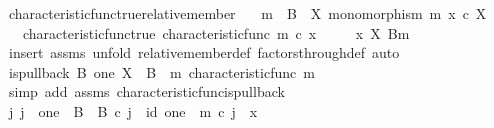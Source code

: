 \begin{isabellebody}
\isamarkupfalse%
%
\endisatagproof
{\isafoldproof}%
%
\isadelimproof
\isanewline
%
\endisadelimproof
\isanewline
{}\isamarkupfalse%
\ characteristic{\isacharunderscore}{\kern0pt}func{\isacharunderscore}{\kern0pt}true{\isacharunderscore}{\kern0pt}relative{\isacharunderscore}{\kern0pt}member{\isacharcolon}{\kern0pt}\isanewline
\ \ \ {\isachardoublequoteopen}m\ {\isacharcolon}{\kern0pt}\ B\ {\isasymrightarrow}\ X{\isachardoublequoteclose}\ {\isachardoublequoteopen}monomorphism\ m{\isachardoublequoteclose}\ {\isachardoublequoteopen}x\ {\isasymin}\isactrlsub c\ X{\isachardoublequoteclose}\isanewline
\ \ \ characteristic{\isacharunderscore}{\kern0pt}func{\isacharunderscore}{\kern0pt}true{\isacharcolon}{\kern0pt}\ {\isachardoublequoteopen}characteristic{\isacharunderscore}{\kern0pt}func\ m\ {\isasymcirc}\isactrlsub c\ x\ {\isacharequal}{\kern0pt}\ {\isasymt}{\isachardoublequoteclose}\isanewline
\ \ \ {\isachardoublequoteopen}x\ {\isasymin}\isactrlbsub X\isactrlesub \ {\isacharparenleft}{\kern0pt}B{\isacharcomma}{\kern0pt}m{\isacharparenright}{\kern0pt}{\isachardoublequoteclose}\isanewline
%
\isadelimproof
%
\endisadelimproof
%
\isatagproof
{}\isamarkupfalse%
\ {\isacharparenleft}{\kern0pt}insert\ assms{\isacharcomma}{\kern0pt}\ unfold\ relative{\isacharunderscore}{\kern0pt}member{\isacharunderscore}{\kern0pt}def{}\ factors{\isacharunderscore}{\kern0pt}through{\isacharunderscore}{\kern0pt}def{\isacharcomma}{\kern0pt}\ auto{\isacharparenright}{\kern0pt}\isanewline
\ \ \isamarkupfalse%
\ {\isachardoublequoteopen}is{\isacharunderscore}{\kern0pt}pullback\ B\ one\ X\ {\isasymOmega}\ {\isacharparenleft}{\kern0pt}{\isasymbeta}\isactrlbsub B\isactrlesub {\isacharparenright}{\kern0pt}\ {\isasymt}\ m\ {\isacharparenleft}{\kern0pt}characteristic{\isacharunderscore}{\kern0pt}func\ m{\isacharparenright}{\kern0pt}{\isachardoublequoteclose}\isanewline
\ \ \ \ \isamarkupfalse%
\ {\isacharparenleft}{\kern0pt}simp\ add{\isacharcolon}{\kern0pt}\ assms\ characteristic{\isacharunderscore}{\kern0pt}func{\isacharunderscore}{\kern0pt}is{\isacharunderscore}{\kern0pt}pullback{\isacharparenright}{\kern0pt}\isanewline
\ \ \isamarkupfalse%
\ \isamarkupfalse%
\ {\isachardoublequoteopen}{\isasymexists}j{\isachardot}{\kern0pt}\ j\ {\isacharcolon}{\kern0pt}\ one\ {\isasymrightarrow}\ B\ {\isasymand}\ {\isasymbeta}\isactrlbsub B\isactrlesub \ {\isasymcirc}\isactrlsub c\ j\ {\isacharequal}{\kern0pt}\ id\ one\ {\isasymand}\ m\ {\isasymcirc}\isactrlsub c\ j\ {\isacharequal}{\kern0pt}\ x{\isachardoublequoteclose}\isanewline

\end{isabellebody}
